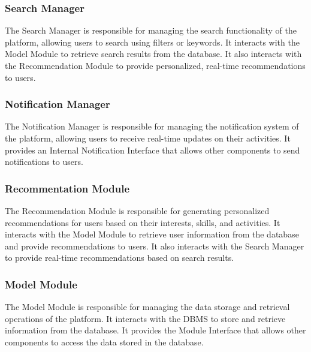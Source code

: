 \subsubsection{Search Manager}
The Search Manager is responsible for managing the search functionality of the platform, allowing users to search using filters or keywords. It interacts with 
the Model Module to retrieve search results from the database. It also interacts with the Recommendation Module to provide personalized, real-time 
recommendations to users.
\subsubsection{Notification Manager}
The Notification Manager is responsible for managing the notification system of the platform, allowing users to receive real-time updates on their activities.
It provides an Internal Notification Interface that allows other components to send notifications to users.
\subsubsection{Recommentation Module}
The Recommendation Module is responsible for generating personalized recommendations for users based on their interests, skills, and activities. It interacts
with the Model Module to retrieve user information from the database and provide recommendations to users. It also interacts with the Search Manager to provide
real-time recommendations based on search results.
\subsubsection{Model Module}
The Model Module is responsible for managing the data storage and retrieval operations of the platform. It interacts with the DBMS to store and retrieve
information from the database. It provides the Module Interface that allows other components to access the data stored in the database.



